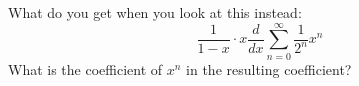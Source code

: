 What do you get when you look at this instead:
\[
\frac{1}{1-x} \cdot x \frac{d}{dx} \sum_{n=0}^\infty \frac{1}{2^n}x^n
\]
What is the coefficient of $x^n$ in the resulting coefficient?
